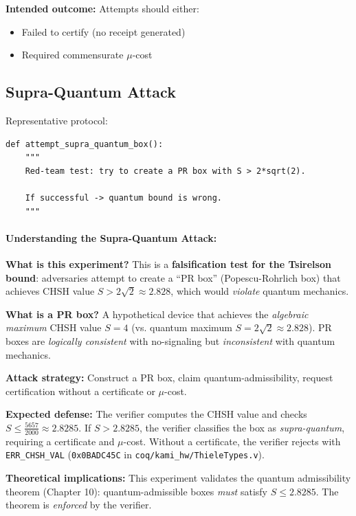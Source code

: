 \textbf{Intended outcome:} Attempts should either:
\begin{itemize}
    \item Failed to certify (no receipt generated)
    \item Required commensurate $\mu$-cost
\end{itemize}

\subsection{Supra-Quantum Attack}

Representative protocol:
\begin{lstlisting}
def attempt_supra_quantum_box():
    """
    Red-team test: try to create a PR box with S > 2*sqrt(2).
    
    If successful -> quantum bound is wrong.
    """
\end{lstlisting}

\paragraph{Understanding the Supra-Quantum Attack:}

\textbf{What is this experiment?} This is a \textbf{falsification test for the Tsirelson bound}: adversaries attempt to create a ``PR box'' (Popescu-Rohrlich box) that achieves CHSH value $S > 2\sqrt{2} \approx 2.828$, which would \textit{violate} quantum mechanics.

\textbf{What is a PR box?} A hypothetical device that achieves the \textit{algebraic maximum} CHSH value $S = 4$ (vs. quantum maximum $S = 2\sqrt{2} \approx 2.828$). PR boxes are \textit{logically consistent} with no-signaling but \textit{inconsistent} with quantum mechanics.

\textbf{Attack strategy:} Construct a PR box, claim quantum-admissibility, request certification without a certificate or $\mu$-cost.

\textbf{Expected defense:} The verifier computes the CHSH value and checks $S \leq \frac{5657}{2000} \approx 2.8285$. If $S > 2.8285$, the verifier classifies the box as \textit{supra-quantum}, requiring a certificate and $\mu$-cost. Without a certificate, the verifier rejects with \texttt{ERR\_CHSH\_VAL} (\texttt{0x0BADC45C} in \texttt{coq/kami\_hw/ThieleTypes.v}).

\textbf{Theoretical implications:} This experiment validates the quantum admissibility theorem (Chapter 10): quantum-admissible boxes \textit{must} satisfy $S \leq 2.8285$. The theorem is \textit{enforced} by the verifier.


